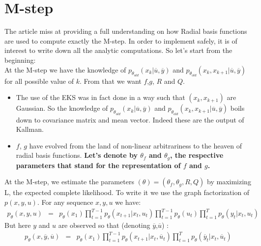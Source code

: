 \section{M-step}

The article miss at providing a full understanding on how Radial basis functions are used to compute exactly the M-step. In order to implement safely, it is of interest to write down all the analytic computations. So let's start from the beginning:\\

At the M-step we have the knowledge of $p_{\theta_{old}}(x_k|\overline{u},\overline{y})$ and $p_{\theta_{old}}(x_k,x_{k+1}|\overline{u},\overline{y})$ for all possible value of $k$. From that we want $f$,$g$, $R$ and $Q$.\\ 

\begin{itemize}
\item The use of the EKS was in fact done in a way such that $(x_k,x_{k+1})$ are Gaussian. So the knowledge of $p_{\theta_{old}}(x_k|\overline{u},\overline{y})$ and $p_{\theta_{old}}(x_k,x_{k+1}|\overline{u},\overline{y})$ boils down to covariance matrix and mean vector. Indeed these are the output of Kallman.
\item $f$, $g$ have evolved from the land of non-linear arbitrariness to the heaven of radial basis functions. \textbf{Let's denote by $\theta_f$ and $\theta_g$, the respective parameters that stand for the representation of $f$ and $g$.}
\end{itemize}

At the M-step, we estimate the parameters $(\theta)=(\theta_f,\theta_g,R,Q)$ by maximizing L, the expected complete likelihood. To write it we use the graph factorization of $p(x,y,u)$. For any sequence $x,y,u$ we have:
\begin{eqnarray}
p_{\theta}(x,y,u)&=& p_{\theta}(x_1)\prod_{t=1}^{T-1}{p_{\theta}(x_{t+1}|x_t,u_t)}\prod_{t=1}^{T-1}{p_{\theta}(u_t)}\prod_{t=1}^{T}{p_{\theta}(y_t|x_t,u_t)}
\end{eqnarray}
But here $y$ and $u$ are observed so that (denoting $\overline{y}$,$\overline{u}$) :
\begin{eqnarray}
%
p_{\theta}(x,\overline{y},\overline{u})&=& p_{\theta}(x_1)\prod_{t=1}^{T-1}{p_{\theta}(x_{t+1}|x_t,\overline{u}_t)}\prod_{t=1}^{T}{p_{\theta}(\overline{y}_t|x_t,\overline{u}_t)}
\end{eqnarray}

